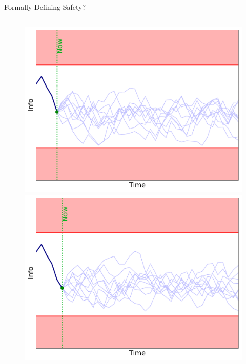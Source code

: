 \documentclass[lecture]{beamer}
\begin{document}
\begin{frame}{\normalsize Formally Defining Safety?}
\begin{columns}[t]
\begin{overlayarea}{\textwidth}{0.3\textheight}
\begin{figure}
{       \hspace{-1.5cm}             \includegraphics[width=\FS\textwidth]{Codes/BasicsSafety/Safe4.pdf}
        }%
        {%
       \hspace{-1.5cm}             \includegraphics[width=\FS\textwidth]{Codes/BasicsSafety/Safe5.pdf}
               }%
        {%
}
\end{figure}
\end{overlayarea}
\end{columns}
\end{frame}
\end{document}

